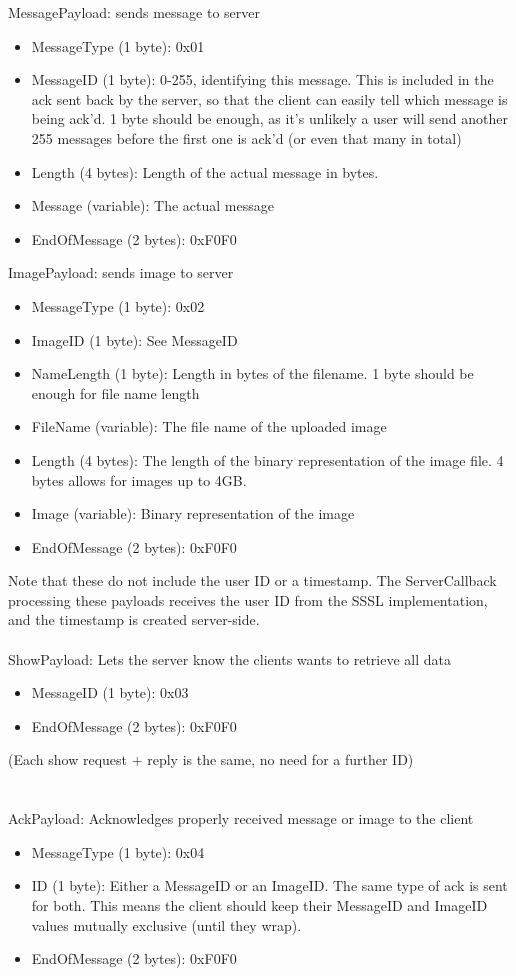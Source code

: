 \documentclass{article}
\begin{document}
MessagePayload: sends message to server
\begin{itemize}
\item MessageType (1 byte): 0x01
\item MessageID (1 byte): 0-255, identifying this message. This is included in the ack sent back by the server, so that the client can easily tell which message is being ack'd. 1 byte should be enough, as it's unlikely a user will send another 255 messages before the first one is ack'd (or even that many in total)
\item Length (4 bytes): Length of the actual message in bytes.
\item Message (variable): The actual message
\item EndOfMessage (2 bytes): 0xF0F0
\end{itemize}
\vspace{8mm}
ImagePayload: sends image to server
\begin{itemize}
\item MessageType (1 byte): 0x02
\item ImageID (1 byte): See MessageID
\item NameLength (1 byte): Length in bytes of the filename. 1 byte should be enough for file name length
\item FileName (variable): The file name of the uploaded image
\item Length (4 bytes): The length of the binary representation of the image file. 4 bytes allows for images up to 4GB.
\item Image (variable): Binary representation of the image
\item EndOfMessage (2 bytes): 0xF0F0
\end{itemize}

Note that these do not include the user ID or a timestamp. The ServerCallback processing these payloads receives the user ID from the SSSL implementation, and the timestamp is created server-side. \\ \\

ShowPayload: Lets the server know the clients wants to retrieve all data
\begin{itemize}
 \item MessageID (1 byte): 0x03
 \item EndOfMessage (2 bytes): 0xF0F0
\end{itemize}
(Each show request + reply is the same, no need for a further ID) \\ \\ \\
AckPayload: Acknowledges properly received message or image to the client
\begin{itemize}
 \item MessageType (1 byte): 0x04
 \item ID (1 byte): Either a MessageID or an ImageID. The same type of ack is sent for both. This means the client should keep their MessageID and ImageID values mutually exclusive (until they wrap).
\item EndOfMessage (2 bytes): 0xF0F0
\end{itemize}
\vspace{8mm}
\end{document}
